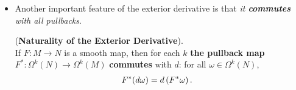 \documentclass[11pt]{article}
\begin{document}
\begin{itemize}
\item Another important feature of the exterior derivative is that \emph{it \textbf{commutes} with all pullbacks}.
\begin{proposition} (\textbf{Naturality of the Exterior Derivative}). \\
If $F: M \rightarrow N$ is a smooth map, then for each $k$ \textbf{the pullback map} $F^{*}: \Omega^k(N) \rightarrow \Omega^k(M)$ \textbf{commutes}
with $d$: for all $\omega \in \Omega^{k}(N)$,
\begin{align}
F^{*}(d\omega) &= d\left(F^{*}\omega\right).  \label{eqn: exterior_derivatives_pullback_commute_2}
\end{align}
\end{proposition}
\end{itemize}

\end{document}
